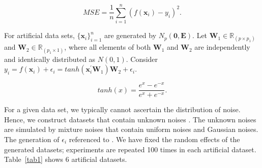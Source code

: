 \documentclass[sn-mathphys,Numbered]{sn-jnl}%
\theoremstyle{thmstyleone}%
\theoremstyle{thmstyletwo}%
\theoremstyle{thmstylethree}%
\begin{document}
\begin{equation}
MSE=\dfrac{1}{n}\sum\limits_{i=1}^n(f(\boldsymbol{x}_i)-y_i)^2. \label{eq14}
\end{equation}

For artificial data sets, $\{\boldsymbol{x}_i\}_{i=1}^n$ are generated by $N_p(\boldsymbol{0},\boldsymbol{E})$. Let $\boldsymbol{W}_1\in \mathbb{R}_{(p\times p_1)}$ and $\boldsymbol{W}_2\in \mathbb{R}_{(p_1\times1)}$, where all elements of both $\boldsymbol{W}_1$ and $\boldsymbol{W}_2$ are independently and identically distributed as $N(0,1)$. Consider $y_i=f(\boldsymbol{x}_i)+\epsilon_i=tanh(\boldsymbol{x}^\prime_i\boldsymbol{W}_1)\boldsymbol{W}_2+\epsilon_i$.

\begin{equation}
tanh(x)=\dfrac{e^x-e^{-x}}{e^x+e^{-x}}.\nonumber
\end{equation}

For a given data set, we typically cannot ascertain the distribution of noise. Hence, we construct datasets that contain unknown noises \cite{bib12}. The unknown noises are simulated by mixture noises that contain uniform noises and Gaussian noises. The generation of $\epsilon_i$ referenced to \cite{bib27}. We have fixed the random effects of the generated datasets; experiments are repeated 100 times in each artificial dataset. Table~\ref{tab1} shows 6 artificial datasets.

\newpage
\end{document}
